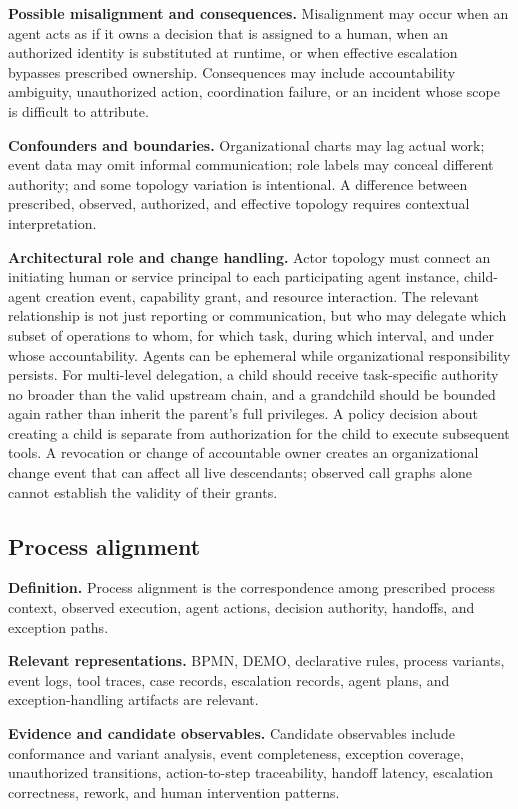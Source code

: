 \documentclass[11pt,letterpaper]{article}
\begin{document}
\textbf{Possible misalignment and consequences.} Misalignment may occur when an agent acts as if it owns a decision that is assigned to a human, when an authorized identity is substituted at runtime, or when effective escalation bypasses prescribed ownership. Consequences may include accountability ambiguity, unauthorized action, coordination failure, or an incident whose scope is difficult to attribute.

\textbf{Confounders and boundaries.} Organizational charts may lag actual work; event data may omit informal communication; role labels may conceal different authority; and some topology variation is intentional. A difference between prescribed, observed, authorized, and effective topology requires contextual interpretation.

\textbf{Architectural role and change handling.} Actor topology must connect an initiating human or service principal to each participating agent instance, child-agent creation event, capability grant, and resource interaction. The relevant relationship is not just reporting or communication, but who may delegate which subset of operations to whom, for which task, during which interval, and under whose accountability. Agents can be ephemeral while organizational responsibility persists. For multi-level delegation, a child should receive task-specific authority no broader than the valid upstream chain, and a grandchild should be bounded again rather than inherit the parent's full privileges. A policy decision about creating a child is separate from authorization for the child to execute subsequent tools. A revocation or change of accountable owner creates an organizational change event that can affect all live descendants; observed call graphs alone cannot establish the validity of their grants.

\subsection{Process alignment}
\textbf{Definition.} Process alignment is the correspondence among prescribed process context, observed execution, agent actions, decision authority, handoffs, and exception paths.

\textbf{Relevant representations.} BPMN, DEMO, declarative rules, process variants, event logs, tool traces, case records, escalation records, agent plans, and exception-handling artifacts are relevant.

\textbf{Evidence and candidate observables.} Candidate observables include conformance and variant analysis, event completeness, exception coverage, unauthorized transitions, action-to-step traceability, handoff latency, escalation correctness, rework, and human intervention patterns.
\end{document}

